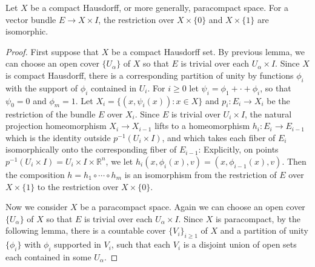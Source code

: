 \begin{prop} Let $X$ be a compact Hausdorff, or more generally, paracompact space. For a vector bundle $E\rightarrow X\times I$, the restriction over $X\times \{0\}$ and $X\times \{1\}$ are isomorphic.
\end{prop}
\begin{proof}
First suppose that $X$ be a compact Hausdorff set. By previous lemma, we can choose an open cover $\{U_\alpha\}$ of $X$ so that $E$ is trivial over each $U_\alpha\times I$. Since $X$ is compact Hausdorff, there is a corresponding partition of unity by functions $\phi_i$ with the support of $\phi_i$ contained in $U_i$. For $i\geq 0$ let $\psi_i=\phi_1+\cdot+\phi_i$, so that $\psi_0=0$ and $\phi_m=1$. Let $X_i=\{(x,\psi_i(x)):x\in X\}$ and $p_i:E_i\rightarrow X_i$ be the restriction of the bundle $E$ over $X_i$. Since $E$ is trivial over $U_i\times I$, the natural projection homeomorphism $X_i\rightarrow X_{i-1}$ lifts to a homeomorphism $h_i:E_i\rightarrow E_{i-1}$ which is the identity outside $p^{-1}(U_i\times I)$, and which takes each fiber of $E_i$ isomorphically onto the corresponding fiber of $E_{i-1}$: Explicitly, on points $p^{-1}(U_i\times I)=U_i\times I\times \mathbb{R}^n$, we let $h_i(x,\phi_i(x),v)=(x,\phi_{i-1}(x),v)$. Then the composition $h=h_1\circ \cdots \circ h_m$ is an isomorphism from the restriction of $E$ over $X\times \{1\}$ to the restriction over $X\times \{0\}$.

Now we consider $X$ be a paracompact space. Again we can choose an open cover $\{U_\alpha\}$ of $X$ so that $E$ is trivial over each $U_\alpha\times I$. Since $X$ is paracompact, by the following lemma, there is a countable cover $\{V_i\}_{i\geq 1}$ of $X$ and a partition of unity $\{\phi_i\}$ with $\phi_i$ supported in $V_i$, such that each $V_i$ is a disjoint union of open sets each contained in some $U_\alpha$.
\end{proof}


